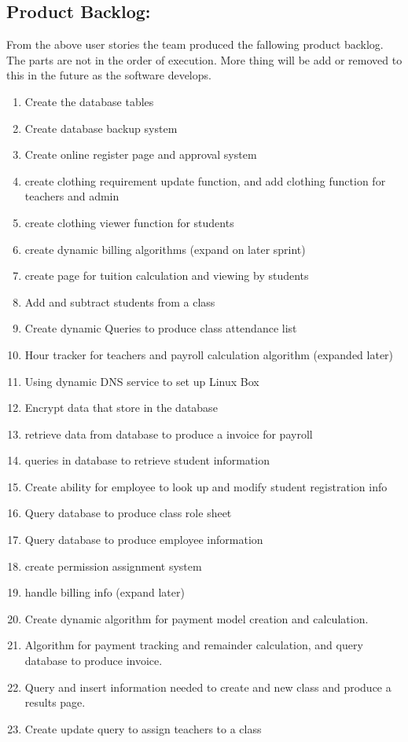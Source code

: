 \subsection{Product Backlog:}

From the above user stories the team produced the fallowing product backlog. The parts are not in the order of execution. More thing will be add or removed to this in the future as the software develops.

\begin{enumerate}
\item Create the database tables
\item Create database backup system
\item Create online register page and approval system
\item create clothing requirement update function, and add clothing function for teachers and admin
\item create clothing viewer function for students
\item create dynamic billing algorithms (expand on later sprint)
\item create page for tuition calculation and viewing by students
\item Add and subtract students from a class
\item Create dynamic Queries to produce class attendance list
\item Hour tracker for teachers and payroll calculation algorithm (expanded later)
\item Using dynamic DNS service to set up Linux Box
\item Encrypt data that store in the database
\item retrieve data from database to produce a invoice for payroll
\item queries in database to retrieve student information
\item Create ability for employee to look up and modify student registration info
\item Query database to produce class role sheet
\item Query database to produce employee information
\item create permission assignment system
\item handle billing info (expand later)
\item Create dynamic algorithm for payment model creation and calculation. 
\item Algorithm for payment tracking and remainder calculation, and query database to produce invoice.
\item Query and insert information needed to create and new class and produce a results page.
\item Create update query to assign teachers to a class
\end{enumerate}

